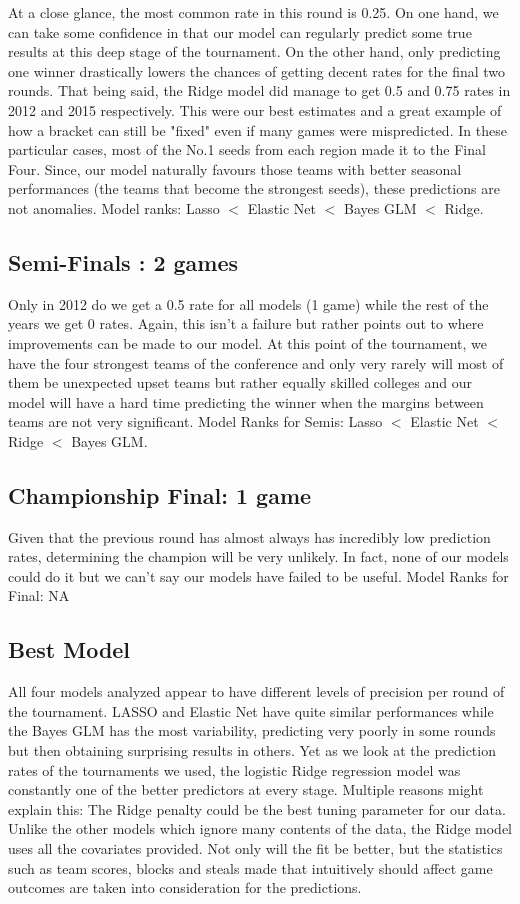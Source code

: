 \documentclass{article} %
\begin{document}
At a close glance, the most common rate in this round is 0.25. On one hand, we can take some confidence in that our model can regularly predict some true results at this deep stage of the tournament. On the other hand, only predicting one winner drastically lowers the chances of getting decent rates for the final two rounds. That being said, the Ridge model did manage to get 0.5 and 0.75 rates in 2012 and 2015 respectively. This were our best estimates and a great example of how a bracket can still be "fixed" even if many games were mispredicted. In these particular cases, most of the No.1 seeds from each region made it to the Final Four. Since, our model naturally favours those teams with better seasonal performances (the teams that become the strongest seeds), these predictions are not anomalies. Model ranks: Lasso  $<$ Elastic Net $<$ Bayes GLM $<$ Ridge.  

\subsection{Semi-Finals : 2 games}

Only in 2012 do we get a 0.5 rate for all models (1 game) while the rest of the years we get 0 rates. Again, this isn't a failure but rather points out to where improvements can be made to our model. At this point of the tournament, we have the four strongest teams of the conference and only very rarely will most of them be unexpected upset teams but rather equally skilled colleges and our model will have a hard time predicting the winner when the margins between teams are not very significant. Model Ranks for Semis: Lasso  $<$ Elastic Net $<$ Ridge $<$ Bayes GLM.  

\subsection{Championship Final: 1 game}
Given that the previous round has almost always has incredibly low prediction rates, determining the champion will be very unlikely. In fact, none of our models could do it but we can't say our models have failed to be useful. Model Ranks for Final: NA

\subsection{Best Model}

All four models analyzed appear to have different levels of precision per round of the tournament. LASSO and Elastic Net have quite similar performances while the Bayes GLM has the most variability, predicting very poorly in some rounds but then obtaining surprising results in others. Yet as we look at the prediction rates of the tournaments we used, the logistic Ridge regression model was constantly one of the better predictors at every stage. Multiple reasons might explain this: The Ridge penalty could be the best tuning parameter for our data. Unlike the other models which ignore many contents of the data, the Ridge model uses all the covariates provided. Not only will the fit be better, but the statistics such as team scores, blocks and steals made that intuitively should affect game outcomes are taken into consideration for the predictions.
\end{document}
